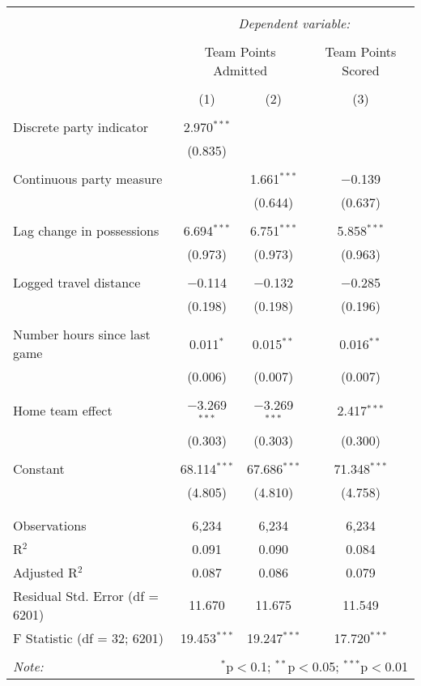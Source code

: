 \documentclass[letterpaper,12pt]{article}
\begin{document}
\hspace{-35pt}
\begin{tabular}{@{\extracolsep{5pt}}lccc}  \\[-1.8ex]\hline  \hline \\[-1.8ex]   & \multicolumn{3}{c}{\textit{Dependent variable:}} \\  \cline{2-4}  \\[-1.8ex] & \multicolumn{2}{c}{Team Points Admitted} & Team Points Scored \\  \\[-1.8ex] & (1) & (2) & (3)\\  \hline \\[-1.8ex]   Discrete party indicator & 2.970$^{***}$ &  &  \\    & (0.835) &  &  \\    & & & \\   Continuous party measure &  & 1.661$^{***}$ & $-$0.139 \\    &  & (0.644) & (0.637) \\    & & & \\   Lag change in possessions & 6.694$^{***}$ & 6.751$^{***}$ & 5.858$^{***}$ \\    & (0.973) & (0.973) & (0.963) \\    & & & \\   Logged travel distance & $-$0.114 & $-$0.132 & $-$0.285 \\    & (0.198) & (0.198) & (0.196) \\    & & & \\   Number hours since last game & 0.011$^{*}$ & 0.015$^{**}$ & 0.016$^{**}$ \\    & (0.006) & (0.007) & (0.007) \\    & & & \\   Home team effect & $-$3.269$^{***}$ & $-$3.269$^{***}$ & 2.417$^{***}$ \\    & (0.303) & (0.303) & (0.300) \\    & & & \\   Constant & 68.114$^{***}$ & 67.686$^{***}$ & 71.348$^{***}$ \\    & (4.805) & (4.810) & (4.758) \\    & & & \\  \hline \\[-1.8ex]  Observations & 6,234 & 6,234 & 6,234 \\  R$^{2}$ & 0.091 & 0.090 & 0.084 \\  Adjusted R$^{2}$ & 0.087 & 0.086 & 0.079 \\  Residual Std. Error (df = 6201) & 11.670 & 11.675 & 11.549 \\  F Statistic (df = 32; 6201) & 19.453$^{***}$ & 19.247$^{***}$ & 17.720$^{***}$ \\  \hline  \hline \\[-1.8ex]  \textit{Note:}  & \multicolumn{3}{r}{$^{*}$p$<$0.1; $^{**}$p$<$0.05; $^{***}$p$<$0.01} \\  \end{tabular}  
\end{document}

